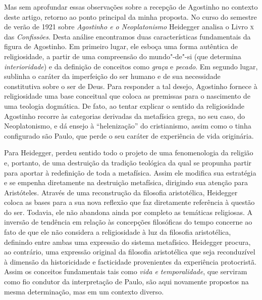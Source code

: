 Mas sem aprofundar essas observações sobre a recepção de
Agostinho no contexto deste artigo, retorno ao ponto principal
da minha proposta. No curso do semestre de verão de 1921 sobre
\emph{Agostinho e o Neoplatonismo} Heidegger analisa o Livro
\textsc{x}
das \emph{Confissões}. Desta análise encontramos duas
características fundamentais da figura de Agostinho. Em primeiro
lugar, ele esboça uma forma autêntica de religiosidade, a partir
de uma compreensão do mundo"-de"-si (que determina
\emph{interioridade}) e da definição de conceitos como
\emph{graça} e \emph{pecado}. Em segundo lugar, sublinha o
caráter da imperfeição do ser humano e de sua necessidade
constitutiva sobre o ser de Deus. Para responder a tal desejo,
Agostinho fornece à religiosidade uma base conceitual que coloca
as premissas para o nascimento de uma teologia dogmática. De
fato, ao tentar explicar o sentido da religiosidade Agostinho
recorre às categorias derivadas da metafísica grega, no seu
caso, do Neoplatonismo, e dá ensejo à “helenização” do
cristianismo, assim como o tinha configurado são Paulo, que perde
o seu caráter de experiência de vida originária.

Para Heidegger, perdeu sentido todo o projeto de uma
fenomenologia da religião e, portanto, de uma destruição da
tradição teológica da qual se propunha partir para aportar à
redefinição de toda a metafísica. Assim ele modifica sua
estratégia e se empenha diretamente na destruição metafísica,
dirigindo sua atenção para Aristóteles. Através de uma
reconstrução da filosofia aristotélica, Heidegger coloca as
bases para a sua nova reflexão que faz diretamente referência à
questão do ser. Todavia, ele não abandona ainda por completo as
temáticas religiosas. A inversão de tendência em relação às
concepções filosóficas do tempo concerne ao fato de que ele não
considera a religiosidade à luz da filosofia aristotélica,
definindo entre ambas uma expressão do sistema metafísico.
Heidegger procura, ao contrário, uma expressão original da
filosofia aristotélica que seja reconduzível à dimensão da
historicidade e facticidade provenientes da experiência
protocristã. Assim os conceitos fundamentais tais como
\emph{vida e temporalidade}, que serviram como fio condutor da
interpretação de Paulo, são aqui novamente propostos na mesma
determinação, mas em um contexto diverso. 

